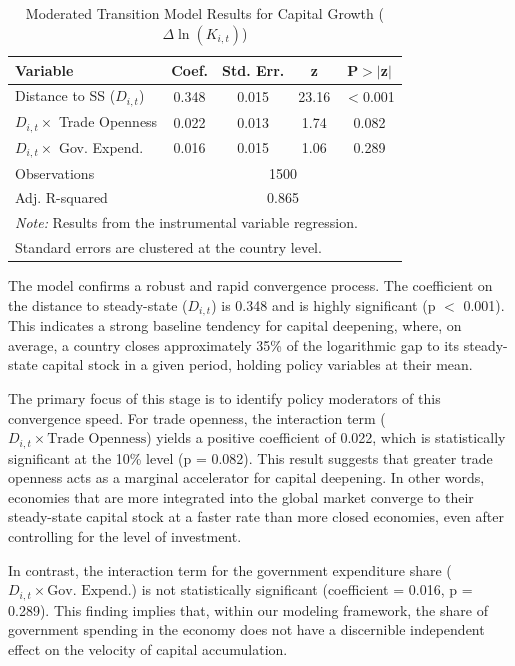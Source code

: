 \documentclass[]{article}
\begin{document}
\begin{table}[h!]
\centering
\caption{Moderated Transition Model Results for Capital Growth ($\Delta \ln(K_{i,t})$)}
\label{tab:moderation_results}
\begin{tabular}{lcccc}
\hline
\hline
Variable & Coef. & Std. Err. & z & P$>$$|$z$|$ \\
\hline
Distance to SS ($D_{i,t}$) & 0.348 & 0.015 & 23.16 & $<$0.001 \\
$D_{i,t} \times$ Trade Openness & 0.022 & 0.013 & 1.74 & 0.082 \\
$D_{i,t} \times$ Gov. Expend. & 0.016 & 0.015 & 1.06 & 0.289 \\
\hline
Observations & \multicolumn{4}{c}{1500} \\
Adj. R-squared & \multicolumn{4}{c}{0.865} \\
\hline
\multicolumn{5}{l}{\footnotesize \textit{Note:} Results from the instrumental variable regression. }\\
\multicolumn{5}{l}{\footnotesize Standard errors are clustered at the country level.}
\end{tabular}
\end{table}

The model confirms a robust and rapid convergence process. The coefficient on the distance to steady-state ($D_{i,t}$) is 0.348 and is highly significant (p $<$ 0.001). This indicates a strong baseline tendency for capital deepening, where, on average, a country closes approximately 35\% of the logarithmic gap to its steady-state capital stock in a given period, holding policy variables at their mean.

The primary focus of this stage is to identify policy moderators of this convergence speed. For trade openness, the interaction term ($D_{i,t} \times \text{Trade Openness}$) yields a positive coefficient of 0.022, which is statistically significant at the 10\% level (p = 0.082). This result suggests that greater trade openness acts as a marginal accelerator for capital deepening. In other words, economies that are more integrated into the global market converge to their steady-state capital stock at a faster rate than more closed economies, even after controlling for the level of investment.

In contrast, the interaction term for the government expenditure share ($D_{i,t} \times \text{Gov. Expend.}$) is not statistically significant (coefficient = 0.016, p = 0.289). This finding implies that, within our modeling framework, the share of government spending in the economy does not have a discernible independent effect on the velocity of capital accumulation.
\end{document}
